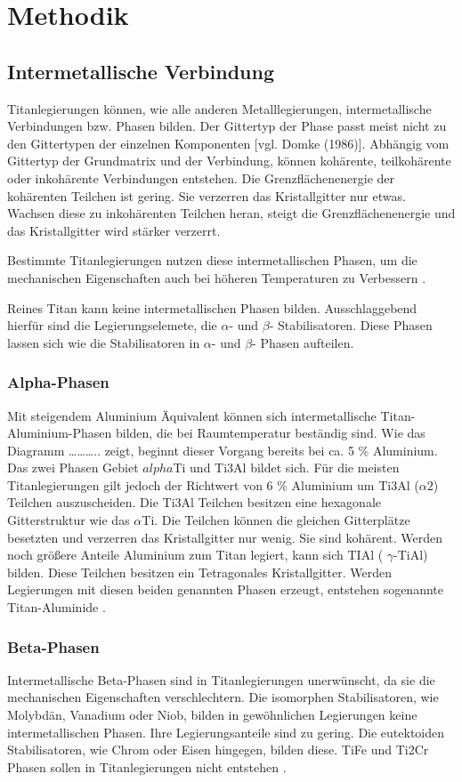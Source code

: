 \documentclass[a4paper, 11pt]{tubsreprt}
\begin{document}
\chapter{Methodik}
\section{Intermetallische Verbindung}
Titanlegierungen können, wie alle anderen Metalllegierungen, intermetallische Verbindungen bzw. Phasen bilden. Der Gittertyp der Phase passt meist nicht zu den Gittertypen der einzelnen Komponenten [vgl. Domke (1986)]. Abhängig vom Gittertyp der Grundmatrix und der Verbindung,  können kohärente, teilkohärente oder inkohärente Verbindungen entstehen. Die Grenzflächenenergie der kohärenten Teilchen ist gering. Sie verzerren das Kristallgitter nur etwas. Wachsen diese zu inkohärenten Teilchen heran, steigt die Grenzflächenenergie und das Kristallgitter wird stärker verzerrt.

Bestimmte Titanlegierungen nutzen diese intermetallischen Phasen, um die mechanischen Eigenschaften auch bei höheren Temperaturen zu Verbessern \cite{Luetjering2007}.

Reines Titan kann keine intermetallischen Phasen bilden. Ausschlaggebend hierfür sind die Legierungselemete, die $\alpha$- und $\beta$- Stabilisatoren.  Diese Phasen lassen sich wie die Stabilisatoren  in $\alpha$- und $\beta$- Phasen aufteilen.  
\subsection{Alpha-Phasen}
Mit steigendem Aluminium Äquivalent können sich intermetallische Titan-Aluminium-Phasen bilden, die bei Raumtemperatur beständig sind. Wie das Diagramm ……….. zeigt, beginnt dieser Vorgang bereits bei ca. 5 \% Aluminium. Das zwei Phasen Gebiet $alpha$Ti und Ti3Al bildet sich. Für die meisten Titanlegierungen gilt jedoch der Richtwert von 6 \% Aluminium um Ti3Al ($\alpha2$) Teilchen auszuscheiden.  Die Ti3Al Teilchen besitzen eine hexagonale Gitterstruktur wie das $\alpha$Ti. Die Teilchen können  die gleichen Gitterplätze besetzten und verzerren das Kristallgitter nur wenig. Sie sind kohärent.
Werden noch größere Anteile Aluminium  zum Titan legiert, kann sich TIAl ( $\gamma$-TiAl) bilden. Diese Teilchen besitzen ein Tetragonales Kristallgitter.
 Werden Legierungen mit diesen beiden genannten Phasen erzeugt, entstehen sogenannte Titan-Aluminide \cite[vgl.]{Luetjering2007}.   

\subsection{Beta-Phasen}
Intermetallische Beta-Phasen sind in Titanlegierungen unerwünscht, da sie die mechanischen Eigenschaften verschlechtern. Die isomorphen Stabilisatoren, wie Molybdän, Vanadium oder Niob, bilden in gewöhnlichen Legierungen keine intermetallischen Phasen. Ihre Legierungsanteile sind zu gering. Die eutektoiden Stabilisatoren, wie Chrom oder Eisen hingegen, bilden diese. TiFe und Ti2Cr Phasen sollen in Titanlegierungen nicht entstehen \cite{Luetjering2007}.
\end{document}
